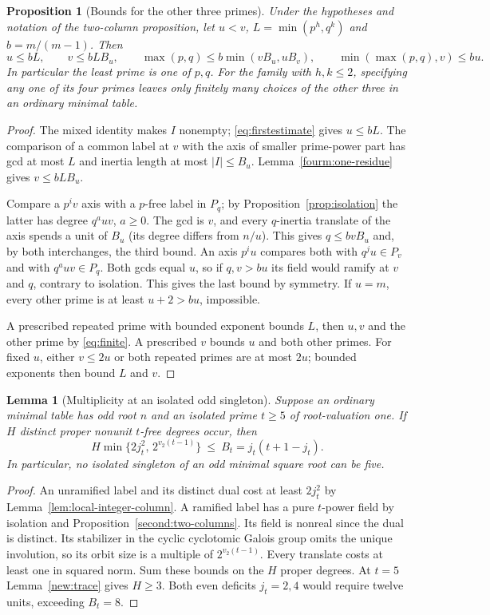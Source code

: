 \documentclass[11pt,a4paper]{article}
\numberwithin{equation}{section}
\newtheorem{proposition}[theorem]{Proposition}
\newtheorem{lemma}[theorem]{Lemma}
\theoremstyle{remark}
\begin{document}
\begin{proposition}[Bounds for the other three primes]\label{fam:M:8.7}\label{note:finite}
Under the hypotheses and notation of the two-column proposition,
let $u<v$, $L=\min(p^h,q^k)$ and $b=m/(m-1)$. Then
\begin{equation}
 u\le bL,\qquad v\le bLB_u,\qquad
 \max(p,q)\le b\min(vB_u,uB_v),\qquad
 \min(\max(p,q),v)\le bu.                                      \label{eq:finite}
\end{equation}
In particular the least prime is one of $p,q$. For the family
with $h,k\le2$, specifying any one of its four primes leaves only
finitely many choices of the other three in an ordinary minimal table.
\end{proposition}
\begin{proof}
The mixed identity makes $I$ nonempty; \eqref{eq:firstestimate} gives
$u\le bL$. The comparison of a common label at $v$ with the axis of
smaller prime-power part has gcd at most $L$ and inertia length
at most $|I|\le B_u$. Lemma~\ref{fourm:one-residue} gives $v\le bLB_u$.

Compare a $p^iv$ axis with a $p$-free label in $P_q$; by
Proposition~\ref{prop:isolation} the latter has degree $q^auv$, $a\ge0$.
The gcd is $v$, and every $q$-inertia translate of the axis spends
a unit of $B_u$ (its degree differs from $n/u$). This gives
$q\le bvB_u$ and, by both interchanges, the third bound.
An axis $p^iu$ compares both with $q^ju\in P_v$ and with
$q^auv\in P_q$. Both gcds equal $u$, so if $q,v>bu$ its field
would ramify at $v$ and $q$, contrary to isolation. This gives the
last bound by symmetry. If $u=m$, every other prime is at least
$u+2>bu$, impossible.

A prescribed repeated prime with bounded exponent bounds $L$, then
$u,v$ and the other prime by \eqref{eq:finite}. A prescribed $v$
bounds $u$ and both other primes. For fixed $u$, either $v\le2u$
or both repeated primes are at most $2u$; bounded exponents then
bound $L$ and $v$.
\end{proof}

\begin{lemma}[Multiplicity at an isolated odd singleton]\label{fam:M:8.8}\label{seq:no-odd-singleton-five}
Suppose an ordinary minimal table has odd root $n$ and an isolated
prime $t\ge5$ of root-valuation one. If $H$ distinct proper nonunit
$t$-free degrees occur, then
\[
 H\min\{2j_t^2,\,2^{v_2(t-1)}\}\ \le\ B_t=j_t(t+1-j_t).
\]
In particular, no isolated singleton of an odd minimal square root can be five.
\end{lemma}
\begin{proof}
An unramified label and its distinct dual cost at least $2j_t^2$
by Lemma~\ref{lem:local-integer-column}. A ramified label has a
pure $t$-power field by isolation and Proposition~\ref{second:two-columns}.
Its field is nonreal since the dual is distinct. Its stabilizer
in the cyclic cyclotomic Galois group omits the unique involution,
so its orbit size is a multiple of $2^{v_2(t-1)}$. Every translate
costs at least one in squared norm. Sum these bounds on the $H$
proper degrees. At $t=5$ Lemma~\ref{new:trace} gives $H\ge3$. Both even
deficits $j_t=2,4$ would require twelve units, exceeding $B_t=8$.
\end{proof}
\end{document}
